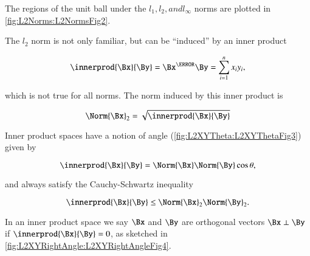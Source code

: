 
The regions of the unit ball under the \( l_1, l_2, and l_\infty \) norms are plotted in \cref{fig:L2Norms:L2NormsFig2}.


The \( l_2 \) norm is not only familiar, but can be ``induced'' by an inner product

\begin{equation}\label{eqn:convex-optimizationLecture2:84}
\innerprod{\Bx}{\By} = \Bx^\T \By = \sum_{i = 1}^n x_i y_i,
\end{equation}

which is not true for all norms.  The norm induced by this inner product is

\begin{dmath}\label{eqn:convex-optimizationLecture2:104}
\Norm{\Bx}_2 = \sqrt{ \innerprod{\Bx}{\By} }
\end{dmath}

Inner product spaces have a notion of angle
(\cref{fig:L2XYTheta:L2XYThetaFig3})
given by

\begin{dmath}\label{eqn:convex-optimizationLecture2:124}
\innerprod{\Bx}{\By} = \Norm{\Bx} \Norm{\By} \cos \theta,
\end{dmath}

and always satisfy the Cauchy-Schwartz inequality

\begin{dmath}\label{eqn:convex-optimizationLecture2:144}
\innerprod{\Bx}{\By} \le \Norm{\Bx}_2 \Norm{\By}_2.
\end{dmath}

In an inner product space we say \( \Bx \) and \( \By \) are orthogonal vectors \( \Bx \perp \By \) if
\( \innerprod{\Bx}{\By} = 0 \), as sketched in
\cref{fig:L2XYRightAngle:L2XYRightAngleFig4}.


